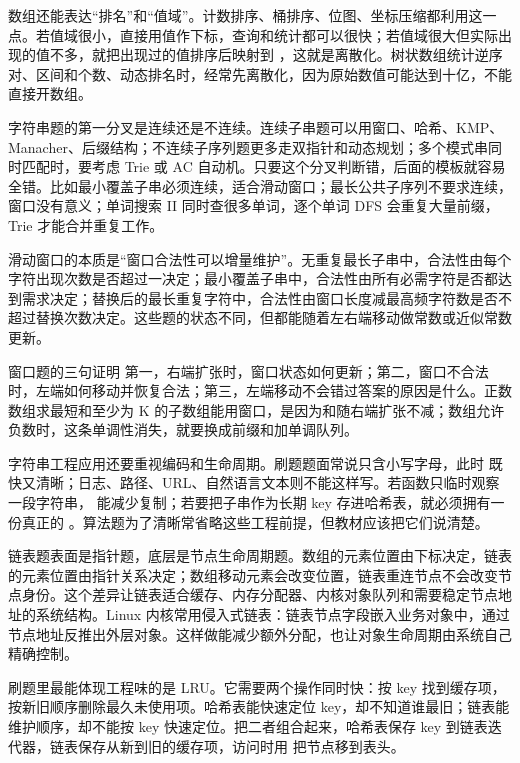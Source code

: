 数组还能表达“排名”和“值域”。计数排序、桶排序、位图、坐标压缩都利用这一点。若值域很小，直接用值作下标，查询和统计都可以很快；若值域很大但实际出现的值不多，就把出现过的值排序后映射到 ，这就是离散化。树状数组统计逆序对、区间和个数、动态排名时，经常先离散化，因为原始数值可能达到十亿，不能直接开数组。


字符串题的第一分叉是连续还是不连续。连续子串题可以用窗口、哈希、KMP、Manacher、后缀结构；不连续子序列题更多走双指针和动态规划；多个模式串同时匹配时，要考虑 Trie 或 AC 自动机。只要这个分叉判断错，后面的模板就容易全错。比如最小覆盖子串必须连续，适合滑动窗口；最长公共子序列不要求连续，窗口没有意义；单词搜索 II 同时查很多单词，逐个单词 DFS 会重复大量前缀，Trie 才能合并重复工作。

滑动窗口的本质是“窗口合法性可以增量维护”。无重复最长子串中，合法性由每个字符出现次数是否超过一决定；最小覆盖子串中，合法性由所有必需字符是否都达到需求决定；替换后的最长重复字符中，合法性由窗口长度减最高频字符数是否不超过替换次数决定。这些题的状态不同，但都能随着左右端移动做常数或近似常数更新。

\begin{principlebox}{窗口题的三句证明}
第一，右端扩张时，窗口状态如何更新；第二，窗口不合法时，左端如何移动并恢复合法；第三，左端移动不会错过答案的原因是什么。正数数组求最短和至少为 K 的子数组能用窗口，是因为和随右端扩张不减；数组允许负数时，这条单调性消失，就要换成前缀和加单调队列。
\end{principlebox}

字符串工程应用还要重视编码和生命周期。刷题题面常说只含小写字母，此时  既快又清晰；日志、路径、URL、自然语言文本则不能这样写。若函数只临时观察一段字符串， 能减少复制；若要把子串作为长期 key 存进哈希表，就必须拥有一份真正的 。算法题为了清晰常省略这些工程前提，但教材应该把它们说清楚。


链表题表面是指针题，底层是节点生命周期题。数组的元素位置由下标决定，链表的元素位置由指针关系决定；数组移动元素会改变位置，链表重连节点不会改变节点身份。这个差异让链表适合缓存、内存分配器、内核对象队列和需要稳定节点地址的系统结构。Linux 内核常用侵入式链表：链表节点字段嵌入业务对象中，通过节点地址反推出外层对象。这样做能减少额外分配，也让对象生命周期由系统自己精确控制。

刷题里最能体现工程味的是 LRU。它需要两个操作同时快：按 key 找到缓存项，按新旧顺序删除最久未使用项。哈希表能快速定位 key，却不知道谁最旧；链表能维护顺序，却不能按 key 快速定位。把二者组合起来，哈希表保存 key 到链表迭代器，链表保存从新到旧的缓存项，访问时用  把节点移到表头。


